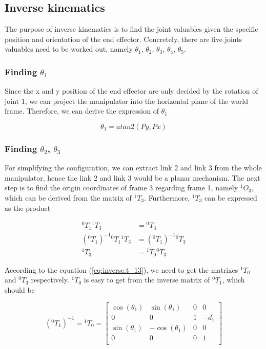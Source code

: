 \documentclass{article}
\renewcommand{\c}[1]{\cos(\theta_{#1})}
\newcommand{\s}[1]{\sin(\theta_{#1})}
\newcommand{\T}[2]{{}^{#1}T_{#2}}
\renewcommand{\O}[2]{{}^{#1}O_{#2}}
\begin{document}
\subsection{Inverse kinematics}
The purpose of inverse kinematics is to find the joint valuables given the specific position and orientation of the end effector. Concretely, there are five joints valuables need to be worked out, namely  $\theta_1$,  $\theta_2$,  $\theta_3$,  $\theta_4$,  $\theta_5$.

\subsubsection{Finding  $\theta_1$}
Since the x and y position of the end effector are only decided by the rotation of joint 1, we can project the manipulator into the horizontal plane of the world frame. Therefore, we can derive the expression of  $\theta_1$

\begin{equation}
\theta_1 = atan2(Py, Px)
\end{equation}

\subsubsection{Finding  $\theta_2$, $\theta_3$}
For simplifying the configuration, we can extract link 2 and link 3 from the whole manipulator, hence the link 2 and link 3 would be a planar mechanism. The next step is to find the origin coordinates of frame 3 regarding frame 1, namely $\O{1}{3}$, which can be derived from the matrix of $\T{1}{3}$. Furthermore, $\T{1}{3}$ can be expressed as the product

\begin{align}
\label{eq:inverse.t_13}
\T{0}{1}\T{1}{3} & = \T{0}{3} \nonumber \\
{(\T{0}{1})}^{-1}\T{0}{1}\T{1}{3}& = {(\T{0}{1})}^{-1} \T{0}{3} \nonumber \\
\T{1}{3} & = \T{1}{0} \T{0}{3}
\end{align}

According to the equation (\ref{eq:inverse.t_13}), we need to get the matrixes $\T{1}{0}$ and $\T{0}{3}$ respectively. $\T{1}{0}$ is easy to get from the inverse matrix of $\T{0}{1}$, which should be 

\begin{equation}
\label{eq:inverse.t_10}
{(\T{0}{1})}^{-1} = \T{1}{0} = \left[
\begin{array}{cccc}
	\c{1} & \s{1} & 0 & 0 \\
	0 & 0 & 1 & -d_1 \\
	\s{1} & -\c{1} & 0 & 0 \\
	0 & 0 & 0 & 1 \\
\end{array}
\right]
\end{equation}
\end{document}
